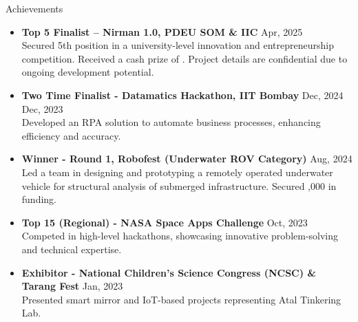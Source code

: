 \documentclass{resume} %
\begin{document}

\begin{rSection}{Achievements} 
\begin{itemize}
    \item \textbf{Top 5 Finalist – Nirman 1.0, PDEU SOM \& IIC } \hfill Apr, 2025 \\ Secured 5th position in a university-level innovation and entrepreneurship competition. Received a cash prize of . Project details are confidential due to ongoing development potential.
    \item \textbf{Two Time Finalist - Datamatics Hackathon, IIT Bombay } \hfill Dec, 2024\\ \hspace*{\fill} Dec, 2023 \\ Developed an RPA solution to automate business processes, enhancing efficiency and accuracy.
    \item \textbf{Winner - Round 1, Robofest (Underwater ROV Category)}  \hfill Aug, 2024 \\ Led a team in designing and prototyping a remotely operated underwater vehicle for structural analysis of submerged infrastructure. Secured ,000 in funding.
    \item \textbf{Top 15 (Regional) - NASA Space Apps Challenge } \hfill Oct, 2023 \\ Competed in high-level hackathons, showcasing innovative problem-solving and technical expertise.
    \item \textbf{Exhibitor - National Children's Science Congress (NCSC) \& Tarang Fest } \hfill Jan, 2023 \\ Presented smart mirror and IoT-based projects representing Atal Tinkering Lab.
\end{itemize}
\end{rSection}
\end{document}
